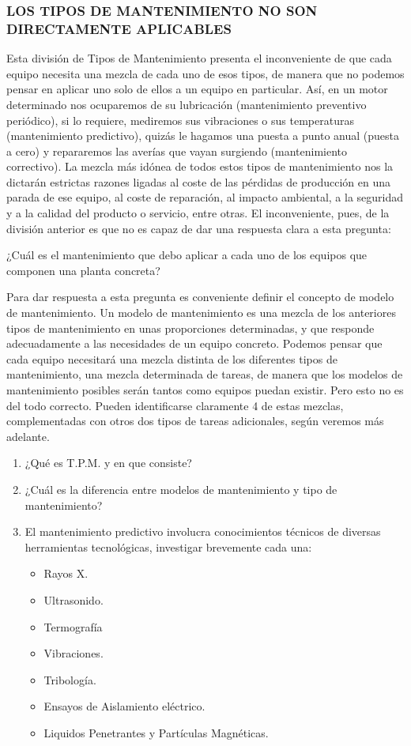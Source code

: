 \subsubsection*{LOS TIPOS DE MANTENIMIENTO NO SON
DIRECTAMENTE APLICABLES}
Esta división de Tipos de Mantenimiento presenta el inconveniente de que
cada equipo necesita una mezcla de cada uno de esos tipos, de manera que no
podemos pensar en aplicar uno solo de ellos a un equipo en particular.
Así, en un motor determinado nos ocuparemos de su lubricación (mantenimiento preventivo periódico), si lo requiere, mediremos sus vibraciones o
sus temperaturas (mantenimiento predictivo), quizás le hagamos una puesta a
punto anual (puesta a cero) y repararemos las averías que vayan surgiendo
(mantenimiento correctivo). La mezcla más idónea de todos estos tipos de
mantenimiento nos la dictarán estrictas razones ligadas al coste de las pérdidas de producción en una parada de ese equipo, al coste de reparación, al impacto ambiental, a la seguridad y a la calidad del producto o servicio, entre
otras.
El inconveniente, pues, de la división anterior es que no es capaz de dar
una respuesta clara a esta pregunta:

¿Cuál es el mantenimiento que debo aplicar a cada uno de los equipos que componen una planta concreta?

Para dar respuesta a esta pregunta es conveniente definir el concepto de modelo de mantenimiento. Un modelo de mantenimiento es una mezcla de los anteriores tipos de mantenimiento en unas proporciones determinadas, y que
responde adecuadamente a las necesidades de un equipo concreto. Podemos
pensar que cada equipo necesitará una mezcla distinta de los diferentes tipos
de mantenimiento, una mezcla determinada de tareas, de manera que los
modelos de mantenimiento posibles serán tantos como equipos puedan existir. Pero esto no es del todo correcto. Pueden identificarse claramente 4 de estas mezclas, complementadas con otros dos tipos de tareas adicionales, según
veremos más adelante.

\begin{enumerate}
    \item ¿Qué es T.P.M. y en que consiste?
    \item ¿Cuál es la diferencia entre modelos de mantenimiento y tipo de mantenimiento?
    \item El mantenimiento predictivo involucra conocimientos técnicos de diversas herramientas tecnológicas, investigar brevemente cada una:
    \begin{itemize}
        \item Rayos X.
        \item Ultrasonido.
        \item Termografía
        \item Vibraciones.
        \item Tribología.
        \item Ensayos de Aislamiento eléctrico.
        \item Liquidos Penetrantes y Partículas Magnéticas.
    \end{itemize}
\end{enumerate}
    